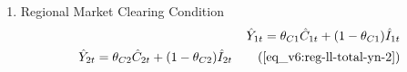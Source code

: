\documentclass[../thesis.tex]{subfiles}
\begin{document}
{\begin{enumerate}
		\item Regional Market Clearing Condition 
		\begin{align}
			\hat{Y}_{1t} = \theta_{C1} \hat{C}_{1t} + (1 - \theta_{C1}) \hat{I}_{1t} \nonumber \\
			\hat{Y}_{2t} = \theta_{C2} \hat{C}_{2t} + (1 - \theta_{C2}) \hat{I}_{2t} \tag{\ref{eq_v6:reg-ll-total-yn-2}}
		\end{align}
		
	\end{enumerate}
	
} %

\begin{comment}

\hrule

\subsubsection{Equations without $\eta$}

\begin{enumerate}
	
	\item Monetary Policy
	\begin{align}
		& \hat{R}_t = \gamma_{R} \hat{R}_{t-1} + (1-\gamma_{R})(\gamma_{\pi} \hat{\pi}_t + \gamma_{Y} \hat{Y}_t) + \hat{Z}_{Mt}
	\end{align}
	
	\item National Gross Inflation Rate
	\begin{align}
		\hat{\pi}_{t} &= \hat{P}_{t} - \hat{P}_{t-1}
	\end{align}
	
	\item National Price Level
	\begin{alignat}{2}
		\hat{P}_{t} + \hat{Y}_{t} &= \theta_{PY1} (\hat{P}_{1t} + \hat{Y}_{1t}) + (1-\theta_{PY1}) (\hat{P}_{2t} + \hat{Y}_{2t})
	\end{alignat}
	
	\item Monetary Shock
	\begin{alignat}{2}
		\hat{Z}_{Mt} &= \rho_M \hat{Z}_{M,t-1} + \varepsilon_{M}
	\end{alignat}
	
	\item Market Clearing Condition
	\begin{align}
		\hat{Y}_{t} &= \theta_{Y} \hat{Y}_{1t} + (1-\theta_{Y}) \hat{Y}_{2t}
	\end{align}
	

\end{comment}
\end{document}
